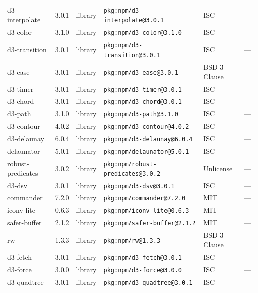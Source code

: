 \documentclass[11pt,a4paper]{article}
\begin{document}
\begin{longtable}{|p{4cm}|p{2cm}|p{1.6cm}|p{5cm}|p{1.5cm}|p{3.5cm}|}
\raggedright d3-interpolate & 3.0.1 & library & \small\texttt{pkg:npm/d3-interpolate@3.0.1} & ISC & \small — \\
\raggedright d3-color & 3.1.0 & library & \small\texttt{pkg:npm/d3-color@3.1.0} & ISC & \small — \\
\raggedright d3-transition & 3.0.1 & library & \small\texttt{pkg:npm/d3-transition@3.0.1} & ISC & \small — \\
\raggedright d3-ease & 3.0.1 & library & \small\texttt{pkg:npm/d3-ease@3.0.1} & BSD-3-Clause & \small — \\
\raggedright d3-timer & 3.0.1 & library & \small\texttt{pkg:npm/d3-timer@3.0.1} & ISC & \small — \\
\raggedright d3-chord & 3.0.1 & library & \small\texttt{pkg:npm/d3-chord@3.0.1} & ISC & \small — \\
\raggedright d3-path & 3.1.0 & library & \small\texttt{pkg:npm/d3-path@3.1.0} & ISC & \small — \\
\raggedright d3-contour & 4.0.2 & library & \small\texttt{pkg:npm/d3-contour@4.0.2} & ISC & \small — \\
\raggedright d3-delaunay & 6.0.4 & library & \small\texttt{pkg:npm/d3-delaunay@6.0.4} & ISC & \small — \\
\raggedright delaunator & 5.0.1 & library & \small\texttt{pkg:npm/delaunator@5.0.1} & ISC & \small — \\
\raggedright robust-predicates & 3.0.2 & library & \small\texttt{pkg:npm/robust-predicates@3.0.2} & Unlicense & \small — \\
\raggedright d3-dsv & 3.0.1 & library & \small\texttt{pkg:npm/d3-dsv@3.0.1} & ISC & \small — \\
\raggedright commander & 7.2.0 & library & \small\texttt{pkg:npm/commander@7.2.0} & MIT & \small — \\
\raggedright iconv-lite & 0.6.3 & library & \small\texttt{pkg:npm/iconv-lite@0.6.3} & MIT & \small — \\
\raggedright safer-buffer & 2.1.2 & library & \small\texttt{pkg:npm/safer-buffer@2.1.2} & MIT & \small — \\
\raggedright rw & 1.3.3 & library & \small\texttt{pkg:npm/rw@1.3.3} & BSD-3-Clause & \small — \\
\raggedright d3-fetch & 3.0.1 & library & \small\texttt{pkg:npm/d3-fetch@3.0.1} & ISC & \small — \\
\raggedright d3-force & 3.0.0 & library & \small\texttt{pkg:npm/d3-force@3.0.0} & ISC & \small — \\
\raggedright d3-quadtree & 3.0.1 & library & \small\texttt{pkg:npm/d3-quadtree@3.0.1} & ISC & \small — \\

\end{longtable}
\end{document}

